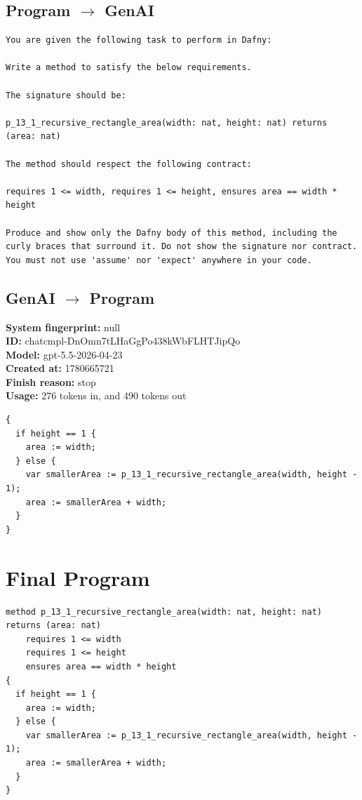 \documentclass{article}
\begin{document}
\subsection*{Program $\rightarrow$ GenAI}
\begin{lstlisting}
You are given the following task to perform in Dafny:

Write a method to satisfy the below requirements.

The signature should be:

p_13_1_recursive_rectangle_area(width: nat, height: nat) returns (area: nat)

The method should respect the following contract:

requires 1 <= width, requires 1 <= height, ensures area == width * height

Produce and show only the Dafny body of this method, including the curly braces that surround it. Do not show the signature nor contract. You must not use 'assume' nor 'expect' anywhere in your code.
\end{lstlisting}
\subsection*{GenAI $\rightarrow$ Program}
\textbf{System fingerprint: }null
\\\textbf{ID: }chatcmpl-DnOmn7tLHaGgPo438kWbFLHTJipQo
\\\textbf{Model: }gpt-5.5-2026-04-23
\\\textbf{Created at: }1780665721
\\\textbf{Finish reason: }stop
\\\textbf{Usage: }276 tokens in, and 490 tokens out
\begin{lstlisting}
{
  if height == 1 {
    area := width;
  } else {
    var smallerArea := p_13_1_recursive_rectangle_area(width, height - 1);
    area := smallerArea + width;
  }
}
\end{lstlisting}
\section*{Final Program}
\begin{lstlisting}
method p_13_1_recursive_rectangle_area(width: nat, height: nat) returns (area: nat)
	requires 1 <= width
	requires 1 <= height
	ensures area == width * height
{
  if height == 1 {
    area := width;
  } else {
    var smallerArea := p_13_1_recursive_rectangle_area(width, height - 1);
    area := smallerArea + width;
  }
}
\end{lstlisting}
\end{document}
